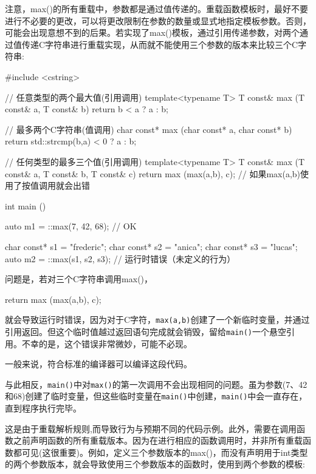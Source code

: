 注意，max()的所有重载中，参数都是通过值传递的。重载函数模板时，最好不要进行不必要的更改，可以将更改限制在参数的数量或显式地指定模板参数。否则，可能会出现意想不到的后果。若实现了max()模板，通过引用传递参数，对两个通过值传递C字符串进行重载实现，从而就不能使用三个参数的版本来比较三个C字符串:

\begin{cpp}
#include <cstring>

// 任意类型的两个最大值(引用调用)
template<typename T>
T const& max (T const& a, T const& b)
{
	return b < a ? a : b;
}

// 最多两个C字符串(值调用)
char const* max (char const* a, char const* b)
{
	return std::strcmp(b,a) < 0 ? a : b;
}

// 任何类型的最多三个值(引用调用)
template<typename T>
T const& max (T const& a, T const& b, T const& c)
{
	return max (max(a,b), c); // 如果max(a,b)使用了按值调用就会出错
}

int main ()
{
	auto m1 = ::max(7, 42, 68); // OK
	
	char const* s1 = "frederic";
	char const* s2 = "anica";
	char const* s3 = "lucas";
	auto m2 = ::max(s1, s2, s3); // 运行时错误（未定义的行为）
}
\end{cpp}

问题是，若对三个C字符串调用max()，

\begin{cpp}
return max (max(a,b), c);
\end{cpp}

就会导致运行时错误，因为对于C字符，\texttt{max(a,b)}创建了一个新临时变量，并通过引用返回。但这个临时值越过返回语句完成就会销毁，留给\texttt{main()}一个悬空引用。不幸的是，这个错误非常微妙，可能不必现。

\begin{notice}
一般来说，符合标准的编译器可以编译这段代码。
\end{notice}

与此相反，\texttt{main()}中对\texttt{max()}的第一次调用不会出现相同的问题。虽为参数(7、42和68)创建了临时变量，但这些临时变量在\texttt{main()}中创建，\texttt{main()}中会一直存在，直到程序执行完毕。

这是由于重载解析规则,而导致行为与预期不同的代码示例。此外，需要在调用函数之前声明函数的所有重载版本。因为在进行相应的函数调用时，并非所有重载函数都可见(这很重要)。例如，定义三个参数版本的max()，而没有声明用于int类型的两个参数版本，就会导致使用三个参数版本的函数时，使用到两个参数的模板:

